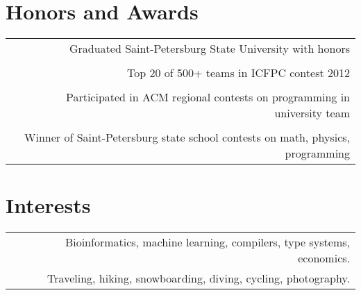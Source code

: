 \documentclass[10pt]{article}
\begin{document}
\section*{Honors and Awards}
\begin{tabular}{L R}
& Graduated Saint-Petersburg State University with honors\\
& \\
& Top 20 of 500+ teams in ICFPC contest 2012\\
& \\
& Participated in ACM regional contests on programming in university team \\
& \\
&  Winner of Saint-Petersburg state school contests on math, physics, programming
\end{tabular}

\section*{Interests}
\begin{tabular}{L R}
	& Bioinformatics, machine learning, compilers, type systems, economics.\\
	& Traveling, hiking, snowboarding, diving, cycling, photography. \\
\end{tabular}
 
\end{document}
